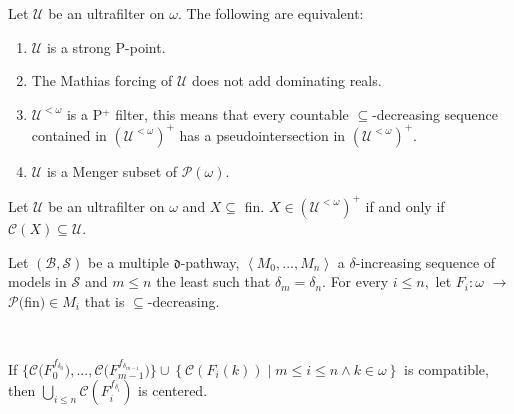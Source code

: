 \documentclass[10pt,a4paper]{amsart}
\begin{document}
\begin{theorem}
Let $\mathcal{U}$ be an ultrafilter on $\omega.$ The following are equivalent:
\label{Equivalencias strong ppoint}

\begin{enumerate}
\item $\mathcal{U}$ is a strong \textsf{P}-point.

\item The Mathias forcing of $\mathcal{U}$ does not add dominating reals.

\item $\mathcal{U}^{<\omega}$ is a \textsf{P}$^{+}$ filter, this means that
every countable $\subseteq$-decreasing sequence contained in $\left(
\mathcal{U}^{<\omega}\right)  ^{+}$ has a pseudointersection in $\left(
\mathcal{U}^{<\omega}\right)  ^{+}.$

\item $\mathcal{U}$ is a Menger subset of $\mathcal{P}\left(  \omega\right)
.$
\end{enumerate}
\end{theorem}

\begin{lemma}
Let $\mathcal{U}$ be an ultrafilter on $\omega$ and $X\subseteq$ \textsf{fin.
}$X\in\left(  \mathcal{U}^{<\omega}\right)  ^{+}$ if and only if
$\mathcal{C}\left(  X\right)  \subseteq\mathcal{U}.$
\label{Lema positivo ultrafiltro}
\end{lemma}

\begin{lemma}
Let $\left(  \mathcal{B},\mathcal{S}\right)  $ be a multiple $\mathfrak{d}%
$-pathway, $\left\langle M_{0},...,M_{n}\right\rangle $ a $\delta$-increasing
sequence of models in $\mathcal{S}$ and $m\leq n$ the least such that
$\delta_{m}=\delta_{n}.$ For every $i\leq n,$ let $F_{i}:\omega$
$\longrightarrow$ $\mathcal{P(}$\textsf{fin}$\mathsf{)}\in M_{i}$ that is
$\subseteq$-decreasing\textsf{.}

\qquad\ \qquad\ \ \ \ \ \ \ \ \ \ 

If $\{\mathcal{C(}F_{0}^{f_{\delta_{0}}}),...,\mathcal{C(}F_{m-1}%
^{f_{\delta_{m-1}}})\}\cup\left\{  \mathcal{C}\left(  F_{i}\left(  k\right)
\right)  \mid m\leq i\leq n\wedge k\in\omega\right\}  $ is compatible, then $%
{\textstyle\bigcup\limits_{i\leq n}}
\mathcal{C}(F_{i}^{f_{\delta_{i}}})$ is centered.
\label{Lema pathway strong ppoint}
\end{lemma}
\end{document}
